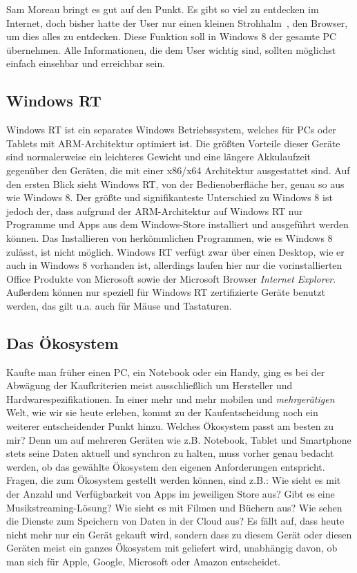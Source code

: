 \documentclass[12pt,a4paper,bibtotoc,abstracton]{scrartcl}
\begin{document}
Sam Moreau bringt es gut auf den Punkt. Es gibt so viel zu entdecken im Internet, doch bisher hatte der User nur einen kleinen \glqq Strohhalm\grqq\ , den Browser, um dies alles zu entdecken. Diese Funktion soll in Windows 8 der gesamte PC übernehmen. Alle Informationen, die dem User wichtig sind, sollten möglichst einfach einsehbar und erreichbar sein.

\subsection{Windows RT}
\label{subsec:winRT}
Windows RT ist ein separates Windows Betriebssystem, welches für PCs oder Tablets mit ARM-Architektur optimiert ist. Die größten Vorteile dieser Geräte sind normalerweise ein leichteres Gewicht und eine längere Akkulaufzeit gegenüber den Geräten, die mit einer x86/x64 Architektur ausgestattet sind. Auf den ersten Blick sieht Windows RT, von der Bedienoberfläche her, genau so aus wie Windows 8. Der größte und signifikanteste Unterschied zu Windows 8 ist jedoch der, dass aufgrund der ARM-Architektur auf Windows RT nur Programme und Apps aus dem Windows-Store installiert und ausgeführt werden können. Das Installieren von herkömmlichen Programmen, wie es Windows 8 zulässt, ist nicht möglich. Windows RT verfügt zwar über einen Desktop, wie er auch in Windows 8 vorhanden ist, allerdings laufen hier nur die vorinstallierten Office Produkte von Microsoft sowie der Microsoft Browser \textit{Internet Explorer}. Außerdem können nur speziell für Windows RT zertifizierte Geräte benutzt werden, das gilt u.a. auch für Mäuse und Tastaturen. \citep{MicrosoftWinRT}  
 
\subsection{Das Ökosystem}
\label{subsec:ökosystem}
Kaufte man früher einen PC, ein Notebook oder ein Handy, ging es bei der Abwägung der Kaufkriterien meist ausschließlich um Hersteller und Hardwarespezifikationen. In einer mehr und mehr mobilen und \textit{mehrgerätigen} Welt, wie wir sie heute erleben, kommt zu der Kaufentscheidung noch ein weiterer entscheidender Punkt hinzu. Welches Ökosystem passt am besten zu mir? Denn um auf mehreren Geräten wie z.B. Notebook, Tablet und Smartphone stets seine Daten aktuell und synchron zu halten, muss vorher genau bedacht werden, ob das gewählte Ökosystem den eigenen Anforderungen entspricht. Fragen, die zum  Ökosystem gestellt werden können, sind z.B.: Wie sieht es mit der Anzahl und Verfügbarkeit von Apps im jeweiligen Store aus? Gibt es eine Musikstreaming-Lösung? Wie sieht es mit Filmen und Büchern aus? Wie sehen die Dienste zum Speichern von Daten in der Cloud aus? Es fällt auf, dass heute nicht mehr nur ein Gerät gekauft wird, sondern dass zu diesem Gerät oder diesen Geräten meist ein ganzes Ökosystem mit geliefert wird, unabhängig davon, ob man sich für Apple, Google, Microsoft oder Amazon entscheidet. 
\end{document}

